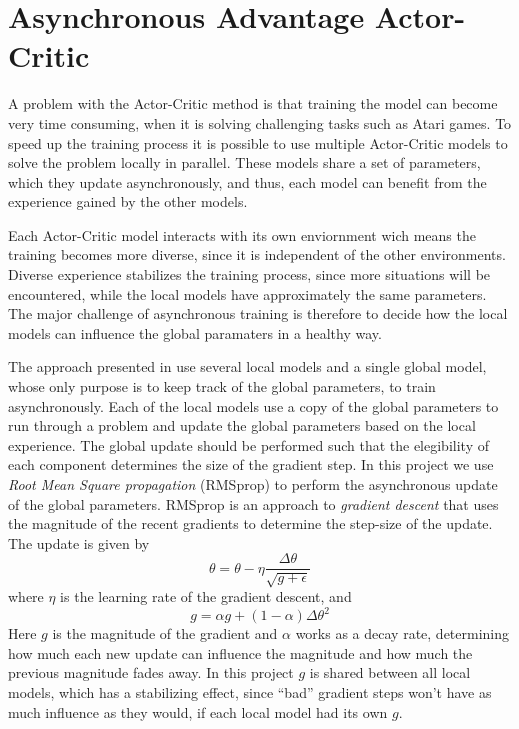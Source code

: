 \documentclass[11pt]{article}
\begin{document}

\section{Asynchronous Advantage Actor-Critic}\label{sec:a3c}

A problem with the Actor-Critic method is that training the model can become very time consuming,
when it is solving challenging tasks such as Atari games.
To speed up the training process it is possible to use 
multiple Actor-Critic models to 
solve the problem locally in parallel.
These models share a set of parameters, which they update asynchronously,
and thus, each model can benefit from the experience gained by the other models.

Each Actor-Critic model interacts with its own enviornment
wich means the training becomes more diverse, since it is independent of the other
environments.
Diverse experience stabilizes the training process,
since more situations will be encountered,
while the local models have approximately the same parameters.
The major challenge of asynchronous training is therefore to decide how
the local models can influence the global paramaters in a healthy
way.

The approach presented in \cite{a3c} use several local models
and a single global model, whose only purpose is to keep track of the global parameters,
to train asynchronously.
Each of the local models use a copy of the global parameters to run through a problem
and update the global parameters based on the local experience.
The global update should be performed such that
the elegibility of each component determines the size of the
gradient step.
In this project we use \textit{Root Mean Square propagation} (RMSprop)
to perform the asynchronous update of the global parameters.
RMSprop is an approach to \textit{gradient descent} 
that uses the magnitude of the recent gradients to
determine the step-size of the update.
The update is given by 
\begin{equation}
    \theta = \theta - \eta \frac{\Delta \theta}{\sqrt{g + \epsilon}}
\end{equation}
where $\eta$ is the learning rate of the gradient descent, and 
\begin{equation}
    g = \alpha g + (1 - \alpha) \Delta \theta^2
\end{equation}
Here $g$ is the magnitude of the gradient and $\alpha$ works as a decay rate, determining how much each new update
can influence the magnitude and how much the previous magnitude fades away.
In this project $g$ is shared between all local models, which has a stabilizing
effect, since “bad” gradient steps won't have as much influence as they would,
if each local model had its own $g$.
\end{document}
